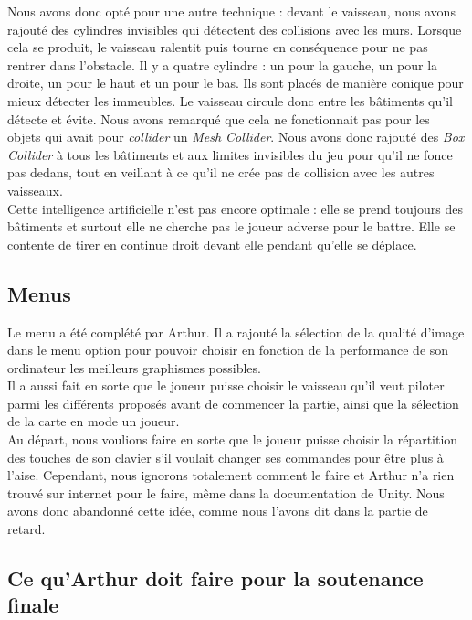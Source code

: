 \documentclass[10pt, titlepage]{report}
\begin{document}
Nous avons donc opté pour une autre technique : devant le vaisseau, nous avons rajouté des cylindres invisibles qui détectent des collisions avec les murs. Lorsque cela se produit, le vaisseau ralentit puis tourne en conséquence pour ne pas rentrer dans l'obstacle. Il y a quatre cylindre : un pour la gauche, un pour la droite, un pour le haut et un pour le bas. Ils sont placés de manière conique pour mieux détecter les immeubles. Le vaisseau circule donc entre les bâtiments qu'il détecte et évite. Nous avons remarqué que cela ne fonctionnait pas pour les objets qui avait pour \textit{collider} un\textit{ Mesh Collider}. Nous avons donc rajouté des \textit{Box Collider} à tous les bâtiments et aux limites invisibles du jeu pour qu'il ne fonce pas dedans, tout en veillant à ce qu'il ne crée pas de collision avec les autres vaisseaux.\\

Cette intelligence artificielle n'est pas encore optimale : elle se prend toujours des bâtiments et surtout elle ne cherche pas le joueur adverse pour le battre. Elle se contente de tirer en continue droit devant elle pendant qu'elle se déplace.\\

\subsection{Menus}

Le menu a été complété par Arthur. Il a rajouté la sélection de la qualité d'image dans le menu option pour pouvoir choisir en fonction de la performance de son ordinateur les meilleurs graphismes possibles.\\

Il a aussi fait en sorte que le joueur puisse choisir le vaisseau qu'il veut piloter parmi les différents proposés avant de commencer la partie, ainsi que la sélection de la carte en mode un joueur.\\

Au départ, nous voulions faire en sorte que le joueur puisse choisir la répartition des touches de son clavier s'il voulait changer ses commandes pour être plus à l'aise. Cependant, nous ignorons totalement comment le faire et Arthur n'a rien trouvé sur internet pour le faire, même dans la documentation de Unity. Nous avons donc abandonné cette idée, comme nous l'avons dit dans la partie de retard.\\

\subsection{Ce qu'Arthur doit faire pour la soutenance finale}
\end{document}
